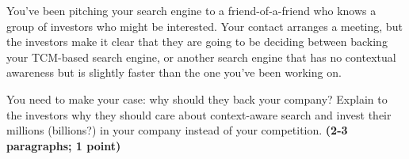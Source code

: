 \documentclass[11pt]{article}
\begin{document}
\begin{enumerate}
  You've been pitching your search engine to a friend-of-a-friend who
  knows a group of investors who might be interested.  Your contact
  arranges a meeting, but the investors make it clear that they
  are going to be deciding between backing your TCM-based search
  engine, or another search engine that has no contextual awareness
  but is slightly faster than the one you've been working on.

You need to make your case: why should they back your company?
Explain to the investors why they should care about context-aware
search and invest their millions (billions?) in your company instead of your
competition.  \textbf{(2-3 paragraphs; 1 point)}

\end{enumerate}
\end{document}
